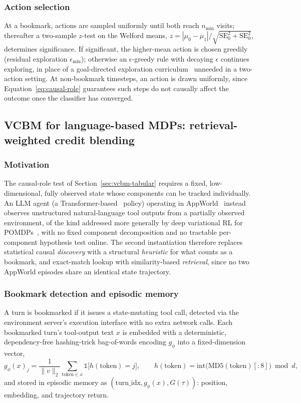 \subsubsection{Action selection}
At a bookmark, actions are sampled uniformly until both reach $n_{\min}$ visits; thereafter a two-sample $z$-test on the Welford means, $z = |\mu_0 - \mu_1| / \sqrt{\mathrm{SE}_0^2 + \mathrm{SE}_0^2}$, determines significance. If significant, the higher-mean action is chosen greedily (residual exploration $\epsilon_{\min}$); otherwise an $\epsilon$-greedy rule with decaying $\epsilon$ continues exploring, in place of a goal-directed exploration curriculum~\cite{florensa2018goalgan,mendonca2021lexa} unneeded in a two-action setting. At non-bookmark timesteps, an action is drawn uniformly, since Equation~\ref{eq:causal-role} guarantees such steps do not causally affect the outcome once the classifier has converged.

\subsection{VCBM for language-based MDPs: retrieval-weighted credit blending}
\label{sec:vcbm-appworld}

\subsubsection{Motivation}
The causal-role test of Section~\ref{sec:vcbm-tabular} requires a fixed, low-dimensional, fully observed state whose components can be tracked individually. An LLM agent (a Transformer-based~\cite{vaswani2017attention} policy) operating in AppWorld~\cite{trivedi2024appworld} instead observes unstructured natural-language tool outputs from a partially observed environment, of the kind addressed more generally by deep variational RL for POMDPs~\cite{igl2018dvrl}, with no fixed component decomposition and no tractable per-component hypothesis test online. The second instantiation therefore replaces statistical causal \emph{discovery} with a structural \emph{heuristic} for what counts as a bookmark, and exact-match lookup with similarity-based \emph{retrieval}, since no two AppWorld episodes share an identical state trajectory.

\subsubsection{Bookmark detection and episodic memory}
A turn is bookmarked if it issues a state-mutating tool call, detected via the environment server's execution interface with no extra network calls. Each bookmarked turn's tool-output text $x$ is embedded with a deterministic, dependency-free hashing-trick bag-of-words encoding $g_\phi$ into a fixed-dimension vector,
\begin{equation}
  g_\phi(x)_j = \frac{1}{\lVert v \rVert_2} \sum_{\mathrm{token} \in x} \mathbb{1}\big[h(\mathrm{token}) = j\big], \qquad h(\mathrm{token}) = \mathrm{int}\big(\mathrm{MD5}(\mathrm{token})[{:}8]\big) \bmod d ,
  \label{eq:hashing-encoder}
\end{equation}
and stored in episodic memory as $(\mathrm{turn\_idx}, g_\phi(x), G(\tau))$: position, embedding, and trajectory return.

